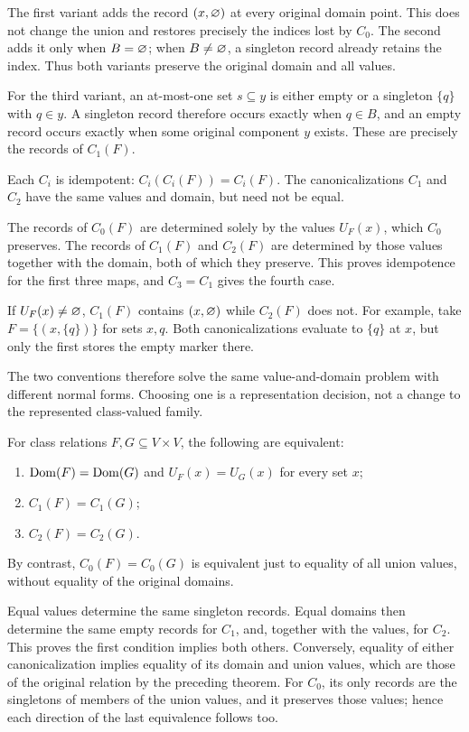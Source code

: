 The first variant adds the record $(x,\varnothing)$ at every original
domain point. This does not change the union and restores precisely the
indices lost by $C_0$. The second adds it only when $B=\varnothing$;
when $B\neq\varnothing$, a singleton record already retains the index.
Thus both variants preserve the original domain and all values.

For the third variant, an at-most-one set $s\subseteq y$ is either empty
or a singleton $\{q\}$ with $q\in y$. A singleton record therefore occurs
exactly when $q\in B$, and an empty record occurs exactly when some
original component $y$ exists. These are precisely the records of $C_1(F)$.
\Done

\begin{corollary}
Each $C_i$ is idempotent: $C_i(C_i(F))=C_i(F)$. The canonicalizations
$C_1$ and $C_2$ have the same values and domain, but need not be equal.
\end{corollary}
\Proof
The records of $C_0(F)$ are determined solely by the values $U_F(x)$,
which $C_0$ preserves. The records of $C_1(F)$ and $C_2(F)$ are determined
by those values together with the domain, both of which they preserve.
This proves idempotence for the first three maps, and $C_3=C_1$ gives the
fourth case.

If $U_F(x)\neq\varnothing$, $C_1(F)$ contains $(x,\varnothing)$ while
$C_2(F)$ does not. For example, take $F=\{(x,\{q\})\}$ for sets $x,q$.
Both canonicalizations evaluate to $\{q\}$ at $x$, but only the first
stores the empty marker there.
\Done

The two conventions therefore solve the same value-and-domain problem
with different normal forms. Choosing one is a representation decision,
not a change to the represented class-valued family.

\begin{theorem}
For class relations $F,G\subseteq V\times V$, the following are equivalent:
\begin{enumerate}
\item $\mathrm{Dom}(F)=\mathrm{Dom}(G)$ and $U_F(x)=U_G(x)$ for every set $x$;
\item $C_1(F)=C_1(G)$;
\item $C_2(F)=C_2(G)$.
\end{enumerate}
By contrast, $C_0(F)=C_0(G)$ is equivalent just to equality of all
union values, without equality of the original domains.
\end{theorem}
\Proof
Equal values determine the same singleton records. Equal domains then
determine the same empty records for $C_1$, and, together with the
values, for $C_2$. This proves the first condition implies both others.
Conversely, equality of either canonicalization implies equality of its
domain and union values, which are those of the original relation by
the preceding theorem. For $C_0$, its only records are the singletons
of members of the union values, and it preserves those values; hence
each direction of the last equivalence follows too.
\Done

